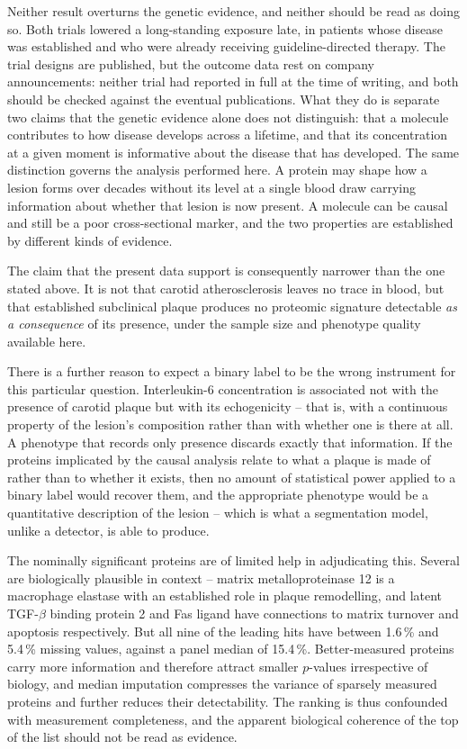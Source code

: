 Neither result overturns the genetic evidence, and neither should be read as doing so. Both
trials lowered a long-standing exposure late, in patients whose disease was established and who
were already receiving guideline-directed therapy. The trial designs are published, but the
outcome data rest on company announcements: neither trial had reported in full at the time of
writing, and both should be checked against the eventual publications. What they do is separate two claims that the
genetic evidence alone does not distinguish: that a molecule contributes to how disease develops
across a lifetime, and that its concentration at a given moment is informative about the disease
that has developed. The same distinction governs the analysis performed here. A protein may shape
how a lesion forms over decades without its level at a single blood draw carrying information
about whether that lesion is now present. A molecule can be causal and still be a poor
cross-sectional marker, and the two properties are established by different kinds of evidence.

The claim that the present data support is consequently narrower than the one stated above. It is not that carotid atherosclerosis leaves no trace in blood, but
that established subclinical plaque produces no proteomic signature detectable \emph{as a
consequence} of its presence, under the sample size and phenotype quality available here.

There is a further reason to expect a binary label to be the wrong instrument for this
particular question. Interleukin-6 concentration is associated not with the presence of carotid
plaque but with its echogenicity \cite{yamagami2004il6} -- that is, with a continuous property
of the lesion's composition rather than with whether one is there at all. A phenotype that
records only presence discards exactly that information. If the proteins implicated by the causal
analysis relate to what a plaque is made of rather than to whether it exists, then no amount of
statistical power applied to a binary label would recover them, and the appropriate phenotype
would be a quantitative description of the lesion -- which is what a segmentation model, unlike a
detector, is able to produce.

The nominally significant proteins are of limited help in adjudicating this. Several are
biologically plausible in context -- matrix metalloproteinase 12 is a macrophage elastase with an
established role in plaque remodelling, and latent TGF-$\beta$ binding protein 2 and Fas ligand
have connections to matrix turnover and apoptosis respectively. But all nine of the leading hits
have between 1.6\,\% and 5.4\,\% missing values, against a panel median of 15.4\,\%. Better-measured
proteins carry more information and therefore attract smaller $p$-values irrespective of biology,
and median imputation compresses the variance of sparsely measured proteins and further reduces
their detectability. The ranking is thus confounded with measurement completeness, and the
apparent biological coherence of the top of the list should not be read as evidence.

